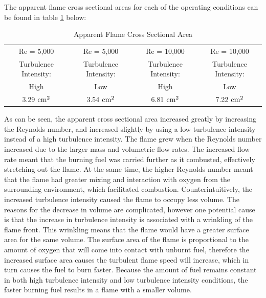 \documentclass[12pt]{ussci} %
\begin{document}
The apparent flame cross sectional areas for each of the operating conditions can be found in table \ref{tab:flameareas} below:

\begin{table}[ht]
\begin{adjustwidth}{-1in}{-1in}
\begin{center}
\begin{tabular}{| c | c | c | c|}
 \hline
 Re = 5,000 & Re = 5,000 & Re = 10,000 & Re = 10,000 \\
 Turbulence Intensity: & Turbulence Intensity: & Turbulence Intensity: & Turbulence Intensity: \\
 High & Low & High & Low\\
\hline
 3.29 $\textnormal{cm}^2$ & 3.54 $\textnormal{cm}^2$& 6.81 $\textnormal{cm}^2$ & 7.22 $\textnormal{cm}^2$\\
 \hline
 \end{tabular}
 \caption{Apparent Flame Cross Sectional Area}\label{tab:flameareas}
 \end{center}
 \end{adjustwidth}
\end{table}

As can be seen, the apparent cross sectional area increased greatly by increasing the Reynolds number, and increased slightly by using a low turbulence intensity instead of a high turbulence intensity.  The flame grew when the Reynolds number increased due to the larger mass and volumetric flow rates.  The increased flow rate meant that the burning fuel was carried further as it combusted, effectively stretching out the flame.  At the same time, the higher Reynolds number meant that the flame had greater mixing and interaction with oxygen from the surrounding environment, which facilitated combustion.  Counterintuitively, the increased turbulence intensity caused the flame to occupy less volume.  The reasons for the decrease in volume are complicated, however one potential cause is that the increase in turbulence intensity is associated with a wrinkling of the flame front.  This wrinkling means that the flame would have a greater surface area for the same volume.  The surface area of the flame is proportional to the amount of oxygen that will come into contact with unburnt fuel, therefore the increased surface area causes the turbulent flame speed will increase, which in turn causes the fuel to burn faster.  Because the amount of fuel remains constant in both high turbulence intensity and low turbulence intensity conditions, the faster burning fuel results in a flame with a smaller volume.
\end{document}
